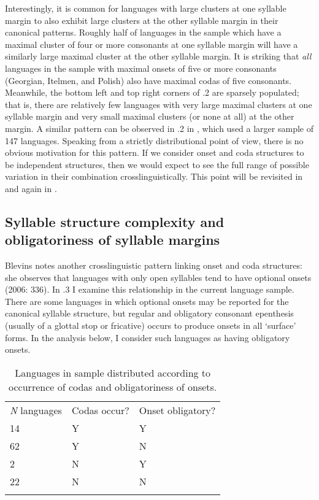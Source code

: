  Interestingly, it is common for languages with large clusters at one syllable margin to also exhibit large clusters at the other syllable margin in their canonical patterns. Roughly half of languages in the sample which have a maximal cluster of four or more consonants at one syllable margin will have a similarly large maximal cluster at the other syllable margin. It is striking that \textit{all} languages in the sample with maximal onsets of five or more consonants (Georgian, Itelmen, and Polish) also have maximal codas of five consonants. Meanwhile, the bottom left and top right corners of .2 are sparsely populated; that is, there are relatively few languages with very large maximal clusters at one syllable margin and very small maximal clusters (or none at all) at the other margin. A similar pattern can be observed in .2 in , which used a larger sample of 147 languages. Speaking from a strictly distributional point of view, there is no obvious motivation for this pattern. If we consider onset and coda structures to be independent structures, then we would expect to see the full range of possible variation in their combination crosslinguistically. This point will be revisited in  and again in .

\subsection{Syllable structure complexity and obligatoriness of syllable margins}\label{sec:3.3.3}

  Blevins notes another crosslinguistic pattern linking onset and coda structures: she observes that languages with only open syllables tend to have optional onsets (2006: 336). In .3 I examine this relationship in the current language sample. There are some languages in which optional onsets may be reported for the canonical syllable structure, but regular and obligatory consonant epenthesis (usually of a glottal stop or fricative) occurs to produce onsets in all ‘surface’ forms. In the analysis below, I consider such languages as having obligatory onsets.

\begin{table}
\begin{tabularx}{\textwidth}{XXX}
\lsptoprule

 \textit{N} languages & Codas occur? & Onset obligatory?\\
 14 & Y & Y\\
 62 & Y & N\\
 2 & N & Y\\
 22 & N & N\\
\lspbottomrule
\end{tabularx}
\caption{\label{3.3}Languages in sample distributed according to occurrence of codas and obligatoriness of onsets.}
\end{table}

